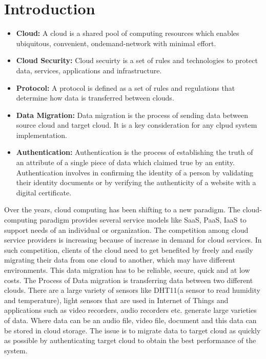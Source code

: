 \documentclass[11pt, pdftex, conference]{IEEEtran}
\begin{document}
\section{\textbf{Introduction}}
\begin{itemize}
\item \textbf{Cloud:} A cloud is a shared pool of computing resources which enables ubiquitous, convenient, ondemand-network with minimal effort\cite{20}. \linebreak
\item \textbf{Cloud Security:} Cloud secuirty is a set of rules and technologies to protect data, services, applications and infrastructure.\linebreak
\item \textbf{Protocol:} A protocol is defined as a set of rules and regulations that determine how data is transferred between clouds\cite{19}.\linebreak
\item \textbf{Data Migration:} Data migration is the process of sending data between source cloud and target cloud. It is a key consideration for any clpud system implementation\cite{18}.\linebreak
\item \textbf{Authentication:} Authentication is the process of establishing the truth of an attribute of a single piece of data which claimed true by an entity. Authentication involves in confirming the identity of a person by validating their identity documents or by verifying the authenticity of a website with a digital certificate\cite{17}.\linebreak 
\end{itemize}
\par
\hspace{15mm}Over the years, cloud computing has been shifting to a new paradigm. The cloud-computing paradigm provides several service models like SaaS, PaaS, IaaS to support needs of an individual or organization. The competition among cloud service providers is increasing because of increase in demand for cloud services. In such competition, clients of the cloud need to get benefited by freely and easily migrating their data from one cloud to another, which may have different environments. This data migration has to be reliable, secure, quick and at low costs.\linebreak
\hspace{15mm}The Process of Data migration is transferring data between two different clouds. There are a large variety of sensors like DHT11(a sensor to read humidity and temperature), light sensors that are used in Internet of Things and applications such as video recorders, audio recorders etc. generate large varieties of data. Where data can be an audio file, video file, document and this data can be stored in cloud storage\cite{3}. The issue is to migrate data to target cloud as quickly as possible by authenticating target cloud to obtain the best performance of the system.\linebreak
\end{document}
